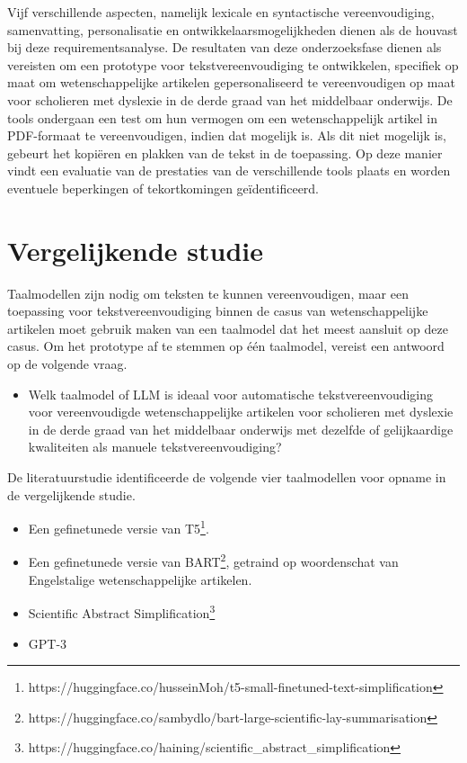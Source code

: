 Vijf verschillende aspecten, namelijk lexicale en syntactische vereenvoudiging, samenvatting, personalisatie en ontwikkelaarsmogelijkheden dienen als de houvast bij deze requirementsanalyse. De resultaten van deze onderzoeksfase dienen als vereisten om een prototype voor tekstvereenvoudiging te ontwikkelen, specifiek op maat om wetenschappelijke artikelen gepersonaliseerd te vereenvoudigen op maat voor scholieren met dyslexie in de derde graad van het middelbaar onderwijs. De tools ondergaan een test om hun vermogen om een wetenschappelijk artikel in PDF-formaat te vereenvoudigen, indien dat mogelijk is. Als dit niet mogelijk is, gebeurt het kopiëren en plakken van de tekst in de toepassing. Op deze manier vindt een evaluatie van de prestaties van de verschillende tools plaats en worden eventuele beperkingen of tekortkomingen geïdentificeerd.

\section{Vergelijkende studie}

Taalmodellen zijn nodig om teksten te kunnen vereenvoudigen, maar een toepassing voor tekstvereenvoudiging binnen de casus van wetenschappelijke artikelen moet gebruik maken van een taalmodel dat het meest aansluit op deze casus. Om het prototype af te stemmen op één taalmodel, vereist een antwoord op de volgende vraag. 

\begin{itemize}
	\item Welk taalmodel of LLM is ideaal voor automatische tekstvereenvoudiging voor vereenvoudigde wetenschappelijke artikelen voor scholieren met dyslexie in de derde graad van het middelbaar onderwijs met dezelfde of gelijkaardige kwaliteiten als manuele tekstvereenvoudiging?
\end{itemize}

De literatuurstudie identificeerde de volgende vier taalmodellen voor opname in de vergelijkende studie.

\begin{itemize}
	\item Een gefinetunede versie van T5\footnote{https://huggingface.co/husseinMoh/t5-small-finetuned-text-simplification}.
	\item Een gefinetunede versie van BART\footnote{https://huggingface.co/sambydlo/bart-large-scientific-lay-summarisation}, getraind op woordenschat van Engelstalige wetenschappelijke artikelen.
	\item Scientific Abstract Simplification\footnote{https://huggingface.co/haining/scientific\_abstract\_simplification}
	\item GPT-3
\end{itemize}

